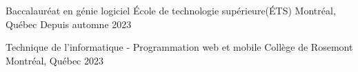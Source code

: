 

\begin{cventries}
  \cventry
    {Baccalauréat en génie logiciel} %
    {École de technologie supérieure(ÉTS)} %
    {Montréal, Québec} %
    {Depuis automne 2023} %
      {} %
      
  \cventry
    {Technique de l'informatique - Programmation web et mobile} %
    {Collège de Rosemont} %
    {Montréal, Québec} %
    {2023} %
    	{} %
\end{cventries}
